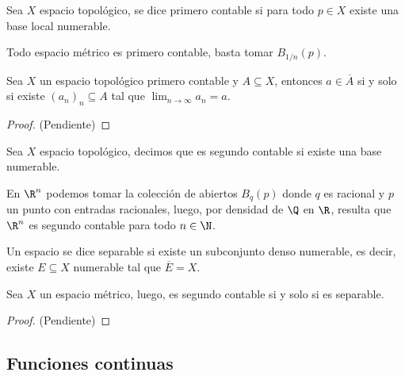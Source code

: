 \documentclass[11pt]{article}
\begin{document}
\begin{dfn}
    Sea $X$ espacio topológico, se dice primero contable si para todo $p\in X$ existe una base 
    local numerable.
\end{dfn}

\obs Todo espacio métrico es primero contable, basta tomar $B_{1/n}(p)$.

\begin{prop}
    Sea $X$ un espacio topológico primero contable y $A\subseteq X$, entonces $a\in\overline{A}$ 
    si y solo si existe $(a_{n})_{n}\subseteq A$ tal que $\lim_{n\to\infty}a_{n}=a$.
\end{prop}

\begin{proof}
    (Pendiente)
\end{proof}

\begin{dfn}
    Sea $X$ espacio topológico, decimos que es segundo contable si existe una base numerable.
\end{dfn}

\noindent En $\R^{n}$ podemos tomar la colección de abiertos $B_{q}(p)$ donde $q$ es racional y 
$p$ un punto con entradas racionales, luego, por densidad de $\Q$ en $\R$, resulta que $\R^{n}$ es
segundo contable para todo $n\in\N$.

\begin{dfn}
    Un espacio se dice separable si existe un subconjunto denso numerable, es decir, existe 
    $E\subseteq X$ numerable tal que $\overline{E}=X$.
\end{dfn}

\begin{teo}
    Sea $X$ un espacio métrico, luego, es segundo contable si y solo si es separable.
\end{teo}

\begin{proof}
    (Pendiente)
\end{proof}

\subsection{Funciones continuas}
\end{document}
